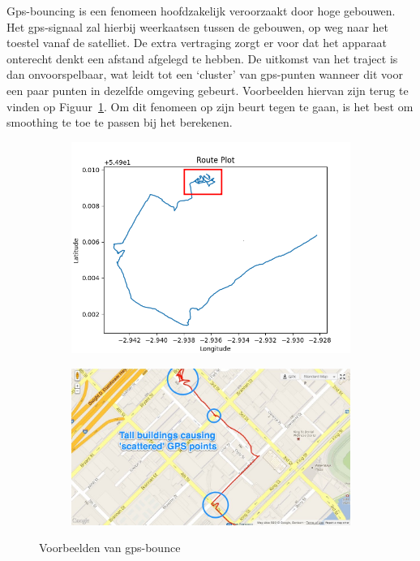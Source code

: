 Gps-bouncing is een fenomeen hoofdzakelijk veroorzaakt door hoge gebouwen. Het
\ac{gps}-signaal zal hierbij weerkaatsen tussen de gebouwen, op weg naar het
toestel vanaf de satelliet. De extra vertraging zorgt er voor dat het apparaat
onterecht denkt een afstand afgelegd te hebben. De uitkomst van het traject is
dan onvoorspelbaar, wat leidt tot een `cluster' van \ac{gps}-punten wanneer dit
voor een paar punten in dezelfde omgeving gebeurt. Voorbeelden hiervan zijn
terug te vinden op Figuur~\ref{fig:gps_bounce}. Om dit fenomeen op zijn beurt
tegen te gaan, is het best om smoothing te toe te passen bij het berekenen.
\begin{figure}
    \centering
    \begin{subfigure}[b]{0.49\textwidth}
        \centering
        \includegraphics[width=\textwidth]{fig/Afwijkingen&Analyses/Crooked Routes/Crooked GPS Route_Cart.png}
    \end{subfigure}
    \begin{subfigure}[b]{0.49\textwidth}
        \centering
        \includegraphics[width=\textwidth]{fig/Afwijkingen&Analyses/Crooked Routes/GPS_bounce_map.jpg}
    \end{subfigure}
    \caption{Voorbeelden van \ac{gps}-bounce~\cite{BadGPSDa19:online}}\label{fig:gps_bounce}
\end{figure}

